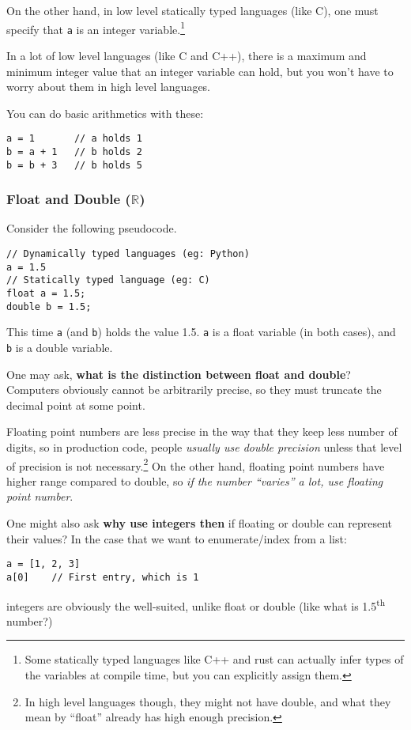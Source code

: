 \documentclass[12pt, a4paper]{article}
\theoremstyle{definition}
\begin{document}
On the other hand, in low level statically typed languages (like C),
one must specify that \lstinline{a} is an integer variable.\footnote{
Some statically typed languages like C++ and rust can actually infer types
of the variables at compile time, but you can explicitly assign them.
}

In a lot of low level languages (like C and C++),
there is a maximum and minimum integer value that an integer variable can hold,
but you won't have to worry about them in high level languages.

You can do basic arithmetics with these:
\begin{lstlisting}
a = 1       // a holds 1
b = a + 1   // b holds 2
b = b + 3   // b holds 5
\end{lstlisting}

\subsubsection{Float and Double ($\mathbb{R}$)}
Consider the following pseudocode.
\begin{lstlisting}
// Dynamically typed languages (eg: Python)
a = 1.5
// Statically typed language (eg: C)
float a = 1.5;
double b = 1.5;
\end{lstlisting}
This time \lstinline{a} (and \lstinline{b}) holds the value 1.5.
\lstinline{a} is a float variable (in both cases),
and \lstinline{b} is a double variable.

One may ask, \textbf{what is the distinction between float and double}?
Computers obviously cannot be arbitrarily precise,
so they must truncate the decimal point at some point.

Floating point numbers are less precise in the way that they keep less number of digits,
so in production code,
people \textit{usually use double precision} unless that level of precision is not necessary.\footnote{In high level languages though, they might not have double, and what they mean by ``float'' already has high enough precision.}
On the other hand, floating point numbers have higher range compared to double,
so \textit{if the number ``varies'' a lot, use floating point number}.

One might also ask \textbf{why use integers then} if floating or double can represent their values?
In the case that we want to enumerate/index from a list:
\begin{lstlisting}
a = [1, 2, 3]
a[0]    // First entry, which is 1
\end{lstlisting}
integers are obviously the well-suited, unlike float or double (like what is 1.5\textsuperscript{th} number?)
\end{document}
